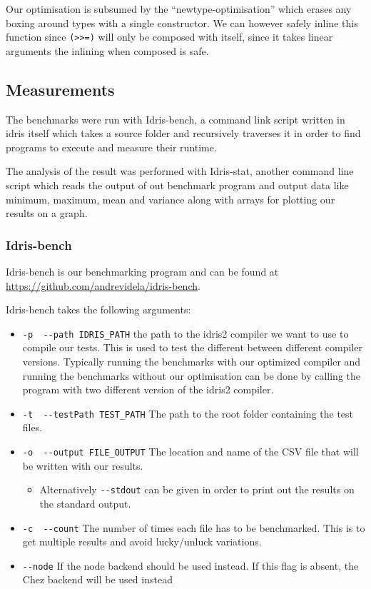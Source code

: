 \documentclass[
]{article}
\providecommand{\tightlist}{%
  \setlength{\itemsep}{0pt}\setlength{\parskip}{0pt}}
\begin{document}
Our optimisation is subsumed by the ``newtype-optimisation'' which
erases any boxing around types with a single constructor. We can however
safely inline this function since
\texttt{(\textgreater{}\textgreater{}=)} will only be composed with
itself, since it takes linear arguments the inlining when composed is
safe.

\hypertarget{measurements}{%
\subsection{Measurements}\label{measurements}}

The benchmarks were run with Idris-bench, a command link script written
in idris itself which takes a source folder and recursively traverses it
in order to find programs to execute and measure their runtime.

The analysis of the result was performed with Idris-stat, another
command line script which reads the output of out benchmark program and
output data like minimum, maximum, mean and variance along with arrays
for plotting our results on a graph.

\hypertarget{idris-bench}{%
\subsubsection{Idris-bench}\label{idris-bench}}

Idris-bench is our benchmarking program and can be found at
\url{https://github.com/andrevidela/idris-bench}.

Idris-bench takes the following arguments:

\begin{itemize}
\tightlist
\item
  \texttt{-p\ \textbar{}\ -\/-path\ IDRIS\_PATH} the path to the idris2
  compiler we want to use to compile our tests. This is used to test the
  different between different compiler versions. Typically running the
  benchmarks with our optimized compiler and running the benchmarks
  without our optimisation can be done by calling the program with two
  different version of the idris2 compiler.
\item
  \texttt{-t\ \textbar{}\ -\/-testPath\ TEST\_PATH} The path to the root
  folder containing the test files.
\item
  \texttt{-o\ \textbar{}\ -\/-output\ FILE\_OUTPUT} The location and
  name of the CSV file that will be written with our results.

  \begin{itemize}
  \tightlist
  \item
    Alternatively \texttt{-\/-stdout} can be given in order to print out
    the results on the standard output.
  \end{itemize}
\item
  \texttt{-c\ \textbar{}\ -\/-count} The number of times each file has
  to be benchmarked. This is to get multiple results and avoid
  lucky/unluck variations.
\item
  \texttt{-\/-node} If the node backend should be used instead. If this
  flag is absent, the Chez backend will be used instead
\end{itemize}
\end{document}
